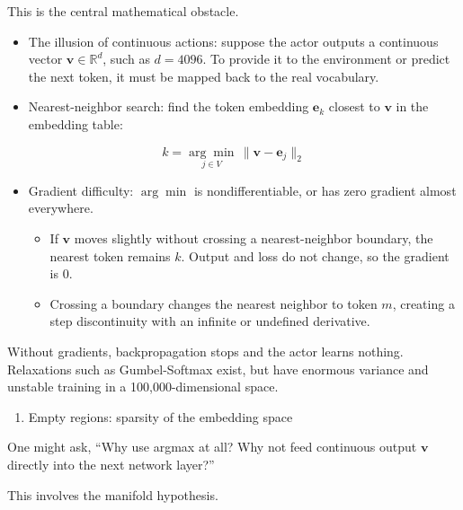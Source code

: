 This is the central mathematical obstacle.

\begin{itemize}
\tightlist
\item
  The illusion of continuous actions: suppose the actor outputs a continuous vector \(\mathbf{v}\in\mathbb{R}^d\), such as \(d=4096\). To provide it to the environment or predict the next token, it must be mapped back to the real vocabulary.
\item
{}
  Nearest-neighbor search: find the token embedding \(\mathbf{e}_k\) closest to \(\mathbf{v}\) in the embedding table:
\end{itemize}

\[
k
=
\underset{j\in V}{\arg\min}\,
\lVert \mathbf{v}-\mathbf{e}_j\rVert_2
\]

\begin{itemize}
\tightlist
\item
  Gradient difficulty: \(\arg\min\) is nondifferentiable, or has zero gradient almost everywhere.

  \begin{itemize}
  \tightlist
  \item
    If \(\mathbf{v}\) moves slightly without crossing a nearest-neighbor boundary, the nearest token remains \(k\). Output and loss do not change, so the gradient is 0.
  \item
    Crossing a boundary changes the nearest neighbor to token \(m\), creating a step discontinuity with an infinite or undefined derivative.
  \end{itemize}
\end{itemize}

Without gradients, backpropagation stops and the actor learns nothing. Relaxations such as Gumbel-Softmax exist, but have enormous variance and unstable training in a 100,000-dimensional space.

\begin{enumerate}
\def\labelenumi{\arabic{enumi}.}
\setcounter{enumi}{1}
\tightlist
\item
  Empty regions: sparsity of the embedding space
\end{enumerate}

One might ask, ``Why use argmax at all? Why not feed continuous output \(\mathbf{v}\) directly into the next network layer?''

This involves the manifold hypothesis.


